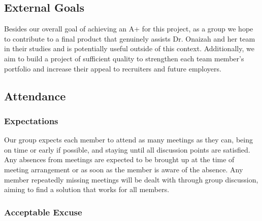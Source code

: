 \documentclass{article}
\begin{document}

\subsection*{External Goals}

Besides our overall goal of achieving an A+ for this project, as a group we hope to 
contribute to a final product that genuinely assists Dr. Onaizah and her team in their 
studies and is potentially useful outside of this context. Additionally, we aim to build 
a project of sufficient quality to strengthen each team member's portfolio and increase 
their appeal to recruiters and future employers.

\subsection*{Attendance}

\subsubsection*{Expectations}

Our group expects each member to attend as many meetings as they can, being on time 
or early if possible, and staying until all discussion points are satisfied. Any 
absences from meetings are expected to be brought up at the time of meeting arrangement 
or as soon as the member is aware of the absence. Any member repeatedly missing meetings 
will be dealt with through group discussion, aiming to find a solution that works for all members.

\subsubsection*{Acceptable Excuse}
\end{document}
